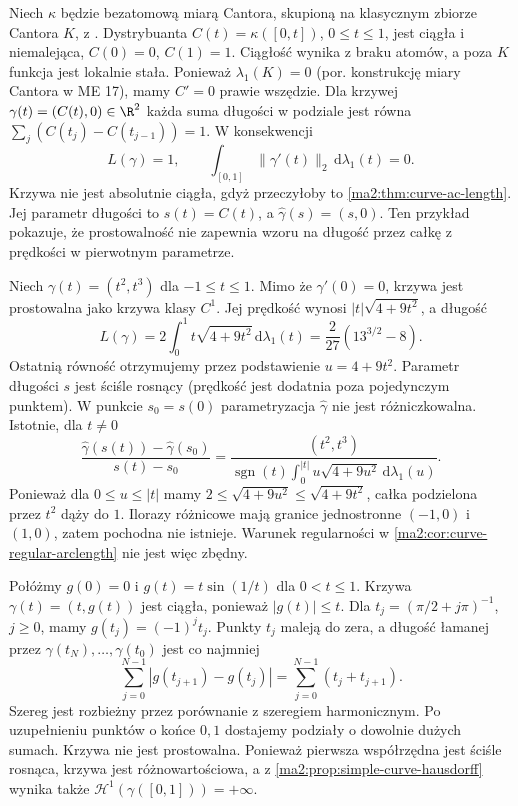 \begin{przyklad}
\label{ma2:ex:curve-cantor}
Niech $\kappa$ będzie bezatomową miarą Cantora,
skupioną na klasycznym zbiorze Cantora $K$,
z .
Dystrybuanta $C(t)=\kappa([0,t])$, $0\le t\le1$,
jest ciągła i niemalejąca, $C(0)=0$, $C(1)=1$.
Ciągłość wynika z braku atomów, a poza $K$ funkcja
jest lokalnie stała. Ponieważ $\lambda_1(K)=0$ (por. konstrukcję miary
Cantora w ME 17), mamy $C'=0$ prawie wszędzie.
Dla krzywej $\gamma(t)=(C(t),0)\in\R^2$
każda suma długości w podziale jest równa
$\sum_j(C(t_j)-C(t_{j-1}))=1$.
W konsekwencji
\[
 L(\gamma)=1,\qquad
 \int_{[0,1]}\|\gamma'(t)\|_2\,\mathrm d\lambda_1(t)=0.
\]
Krzywa nie jest absolutnie ciągła, gdyż
przeczyłoby to \ref{ma2:thm:curve-ac-length}.
Jej parametr długości to $s(t)=C(t)$,
a $\widehat\gamma(s)=(s,0)$.
Ten przykład pokazuje, że prostowalność
nie zapewnia wzoru na długość przez całkę
z prędkości w pierwotnym parametrze.
\end{przyklad}

\begin{przyklad}
\label{ma2:ex:curve-cusp}
Niech $\gamma(t)=(t^2,t^3)$ dla $-1\le t\le1$.
Mimo że $\gamma'(0)=0$, krzywa jest prostowalna
jako krzywa klasy $C^1$. Jej prędkość wynosi
$|t|\sqrt{4+9t^2}$, a długość
\[
 L(\gamma)=2\int_0^1 t\sqrt{4+9t^2}\,\mathrm d\lambda_1(t)
 =\frac{2}{27}(13^{3/2}-8).
\]
Ostatnią równość otrzymujemy przez podstawienie
$u=4+9t^2$. Parametr długości $s$ jest ściśle
rosnący (prędkość jest dodatnia poza pojedynczym
punktem). W punkcie $s_0=s(0)$ parametryzacja
$\widehat\gamma$ nie jest różniczkowalna.
Istotnie, dla $t\ne0$
\[
 \frac{\widehat\gamma(s(t))-\widehat\gamma(s_0)}
 {s(t)-s_0}
 =\frac{(t^2,t^3)}
 {\operatorname{sgn}(t)\int_0^{|t|}u\sqrt{4+9u^2}\,
 \mathrm d\lambda_1(u)}.
\]
Ponieważ dla $0\le u\le|t|$ mamy
$2\le\sqrt{4+9u^2}\le\sqrt{4+9t^2}$,
całka podzielona przez $t^2$ dąży do $1$.
Ilorazy różnicowe mają granice jednostronne
$(-1,0)$ i $(1,0)$, zatem pochodna nie istnieje.
Warunek regularności w
\ref{ma2:cor:curve-regular-arclength}
nie jest więc zbędny.
\end{przyklad}

\begin{przyklad}
\label{ma2:ex:curve-infinite-oscillations}
Połóżmy $g(0)=0$ i $g(t)=t\sin(1/t)$ dla $0<t\le1$.
Krzywa $\gamma(t)=(t,g(t))$ jest ciągła,
ponieważ $|g(t)|\le t$. Dla
$t_j=(\pi/2+j\pi)^{-1}$, $j\ge0$, mamy
$g(t_j)=(-1)^j t_j$.
Punkty $t_j$ maleją do zera, a długość łamanej
przez $\gamma(t_N),\ldots,\gamma(t_0)$ jest co najmniej
\[
 \sum_{j=0}^{N-1}|g(t_{j+1})-g(t_j)|
 =\sum_{j=0}^{N-1}(t_j+t_{j+1}).
\]
Szereg jest rozbieżny przez porównanie z szeregiem
harmonicznym. Po uzupełnieniu punktów o końce
$0,1$ dostajemy podziały o dowolnie dużych sumach.
Krzywa nie jest prostowalna. Ponieważ pierwsza
współrzędna jest ściśle rosnąca, krzywa jest
różnowartościowa, a z
\ref{ma2:prop:simple-curve-hausdorff} wynika także
$\mathcal H^1(\gamma([0,1]))=+\infty$.
\end{przyklad}

